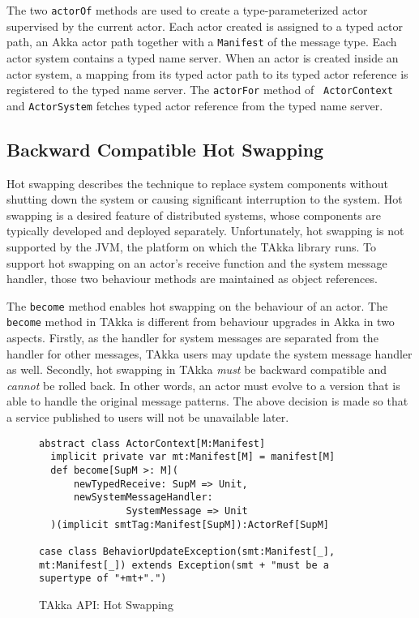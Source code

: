 The two {\tt actorOf} methods are used to create a type-parameterized actor supervised 
by the current actor.  Each actor created is assigned to a typed actor path, 
an Akka actor path together with a {\tt Manifest} of the message type.  Each 
actor system contains a typed name server.  When an actor is created inside an 
actor system, a mapping from its typed actor path to its typed actor reference 
is registered to the typed name server.  The {\tt actorFor} method of {\tt 
ActorContext} and {\tt ActorSystem} fetches typed actor reference from the 
typed name server.


\subsection{Backward Compatible Hot Swapping}
\label{hot_swapping}
Hot swapping describes the technique to replace system components without 
shutting down the system or causing significant interruption to the system.  
Hot swapping is a desired feature of distributed systems, whose components are 
typically developed and deployed separately. Unfortunately, hot  swapping is 
not supported by the JVM, the platform on which the TAkka library runs.  To 
support hot swapping on an actor's receive function and the system message 
handler, those two behaviour methods are maintained as object references.

The {\tt become} method enables hot swapping on the behaviour of an 
actor.  The {\tt become} method in TAkka is different from behaviour 
upgrades in  Akka in two aspects.  Firstly, as the handler for system messages 
are separated from the handler for other messages, TAkka users may update the 
system message handler as well.  Secondly, hot swapping in TAkka {\it must} be 
backward compatible and {\it cannot} be 
rolled back.  In other words, an actor 
must evolve to a version that is able to handle the original
message patterns.  The above decision is made so that a service published to 
users will not be unavailable later.  


\begin{comment}I suggest to enforce backward compatible upgrades whenever
possible to provide better user experience.  If a bad design has to be deprecated,
an error message should be returned, if the received message is a synchronous 
request.  Otherwise, the user cannot tell whether the message is deprecated or lost.}
\end{comment}

\begin{figure}
\label{become}
\begin{lstlisting}
abstract class ActorContext[M:Manifest] 
  implicit private var mt:Manifest[M] = manifest[M]
  def become[SupM >: M](
      newTypedReceive: SupM => Unit,
      newSystemMessageHandler:
               SystemMessage => Unit
  )(implicit smtTag:Manifest[SupM]):ActorRef[SupM] 

case class BehaviorUpdateException(smt:Manifest[_], mt:Manifest[_]) extends Exception(smt + "must be a supertype of "+mt+".")
\end{lstlisting}
\caption{TAkka API: Hot Swapping}
\end{figure}

